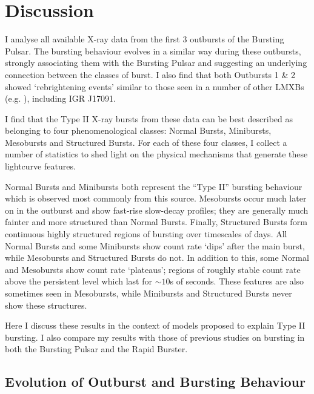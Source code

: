 \section{Discussion}

\par I analyse all available X-ray data from the first 3 outbursts of the Bursting Pulsar.  The bursting behaviour evolves in a similar way during these outbursts, strongly associating them with the Bursting Pulsar and suggesting an underlying connection between the classes of burst.  I also find that both Outbursts 1 \& 2 showed `rebrightening events' similar to those seen in a number of other LMXBs (e.g. \citealp{Wijnands_1808,Patruno_Reflares2}), including IGR J17091.
\par I find that the Type II X-ray bursts from these data can be best described as belonging to four phenomenological classes: Normal Bursts, Minibursts, Mesobursts and Structured Bursts.  For each of these four classes, I collect a number of statistics to shed light on the physical mechanisms that generate these lightcurve features.
\par Normal Bursts and Minibursts both represent the ``Type II'' bursting behaviour which is observed most commonly from this source.   Mesobursts occur much later on in the outburst and show fast-rise slow-decay profiles; they are generally much fainter and more structured than Normal Bursts.  Finally, Structured Bursts form continuous highly structured regions of bursting over timescales of days.  All Normal Bursts and some Minibursts show count rate `dips' after the main burst, while Mesobursts and Structured Bursts do not.  In addition to this, some Normal and Mesobursts show count rate `plateaus'; regions of roughly stable count rate above the persistent level which last for $\sim10$s of seconds.  These features are also sometimes seen in Mesobursts, while Minibursts and Structured Bursts never show these structures.
\par Here I discuss these results in the context of models proposed to explain Type II bursting.  I also compare my results with those of previous studies on bursting in both the Bursting Pulsar and the Rapid Burster.

\subsection{Evolution of Outburst and Bursting Behaviour}

